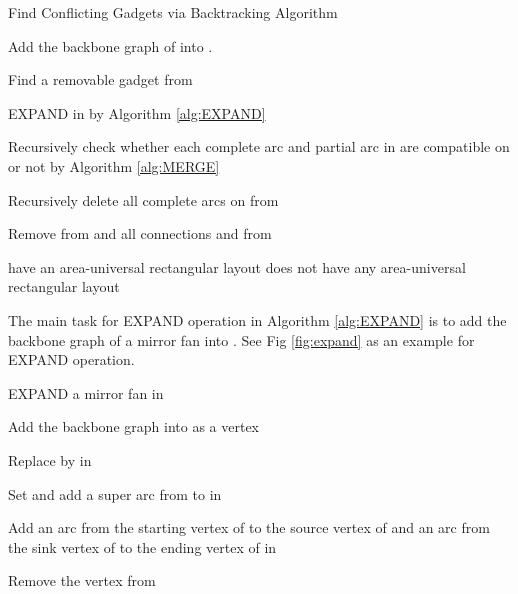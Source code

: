 \documentclass[11pt]{article}
\begin{document}
\begin{algorithm}[t]
\caption{Find Conflicting Gadgets via Backtracking Algorithm}
\label{alg:backtrack-conflict-gadgets}


Add the backbone graph  of  into .
\;

{
Find a removable gadget  from \;

{
{
EXPAND  in  by Algorithm \ref{alg:EXPAND}\;
}
}
{
{
Recursively check whether
each complete arc and partial arc in  are compatible on  or not
by Algorithm \ref{alg:MERGE}\;

}
Recursively delete all complete arcs on  from \;
}

Remove  from  and
all connections  and  from \;

}



{
 have an area-universal rectangular layout\;
}
\Else
{
 does not have any area-universal rectangular layout\;
}
\end{algorithm}


The main task for EXPAND operation in Algorithm \ref{alg:EXPAND} is to add the backbone graph of a mirror fan into .
See Fig \ref{fig:expand} as an example for EXPAND operation.

\begin{algorithm}[t]
\caption{EXPAND a mirror fan in }
\label{alg:EXPAND}


Add the backbone graph  into  as a vertex \;

{

Replace  by
 in \;

Set  and
add a super arc from  to  in \;

Add an arc from the starting vertex of  to the source vertex of  and
an arc from the sink vertex of  to the ending vertex of  in \;

Remove the vertex  from \;
}
\end{algorithm}
\end{document}

